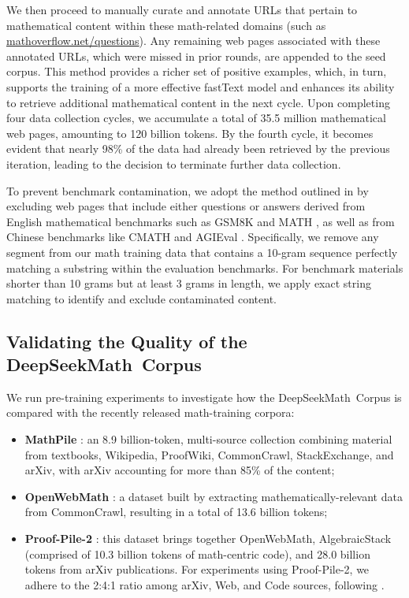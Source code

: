 \begin{itemize}[topsep=0pt]
We then proceed to manually curate and annotate URLs that pertain to mathematical content within these math-related domains (such as \url{mathoverflow.net/questions}). Any remaining web pages associated with these annotated URLs, which were missed in prior rounds, are appended to the seed corpus. This method provides a richer set of positive examples, which, in turn, supports the training of a more effective fastText model and enhances its ability to retrieve additional mathematical content in the next cycle. Upon completing four data collection cycles, we accumulate a total of 35.5 million mathematical web pages, amounting to 120 billion tokens. By the fourth cycle, it becomes evident that nearly 98\% of the data had already been retrieved by the previous iteration, leading to the decision to terminate further data collection.

To prevent benchmark contamination, we adopt the method outlined in \cite{deepseek-coder} by excluding web pages that include either questions or answers derived from English mathematical benchmarks such as GSM8K \citep{gsm8k} and MATH \citep{MATH}, as well as from Chinese benchmarks like CMATH \citep{wei2023cmath} and AGIEval \citep{agieval}. Specifically, we remove any segment from our math training data that contains a 10-gram sequence perfectly matching a substring within the evaluation benchmarks. For benchmark materials shorter than 10 grams but at least 3 grams in length, we apply exact string matching to identify and exclude contaminated content.

\subsection{Validating the Quality of the DeepSeekMath~Corpus}

We run pre-training experiments to investigate how the DeepSeekMath~Corpus is compared with the recently released math-training corpora:

\begin{itemize}[topsep=0pt]
    \item \textbf{MathPile} \citep{mathpile}: an 8.9 billion-token, multi-source collection combining material from textbooks, Wikipedia, ProofWiki, CommonCrawl, StackExchange, and arXiv, with arXiv accounting for more than 85\% of the content;
    \item \textbf{OpenWebMath} \citep{openwebmath}: a dataset built by extracting mathematically-relevant data from CommonCrawl, resulting in a total of 13.6 billion tokens;
    \item \textbf{Proof-Pile-2} \citep{llemma}: this dataset brings together OpenWebMath, AlgebraicStack (comprised of 10.3 billion tokens of math-centric code), and 28.0 billion tokens from arXiv publications. For experiments using Proof-Pile-2, we adhere to the 2:4:1 ratio among arXiv, Web, and Code sources, following \cite{llemma}.
\end{itemize}


\end{itemize}
